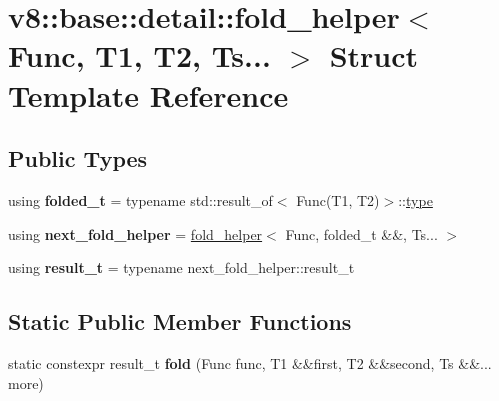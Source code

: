 \hypertarget{structv8_1_1base_1_1detail_1_1fold__helper_3_01Func_00_01T1_00_01T2_00_01Ts_8_8_8_01_4}{}\section{v8\+:\+:base\+:\+:detail\+:\+:fold\+\_\+helper$<$ Func, T1, T2, Ts... $>$ Struct Template Reference}
\label{structv8_1_1base_1_1detail_1_1fold__helper_3_01Func_00_01T1_00_01T2_00_01Ts_8_8_8_01_4}
\subsection*{Public Types}
\begin{DoxyCompactItemize}
\item 
\mbox{\label{structv8_1_1base_1_1detail_1_1fold__helper_3_01Func_00_01T1_00_01T2_00_01Ts_8_8_8_01_4_aca9659e632ee354315e602739c4b3b17}} 
using {\bfseries folded\+\_\+t} = typename std\+::result\+\_\+of$<$ Func(T1, T2)$>$\+::\mbox{\hyperlink{classstd_1_1conditional_1_1type}{type}}
\item 
\mbox{\label{structv8_1_1base_1_1detail_1_1fold__helper_3_01Func_00_01T1_00_01T2_00_01Ts_8_8_8_01_4_a92c0450cb166ab3a1f85ac339ebaeb11}} 
using {\bfseries next\+\_\+fold\+\_\+helper} = \mbox{\hyperlink{structv8_1_1base_1_1detail_1_1fold__helper}{fold\+\_\+helper}}$<$ Func, folded\+\_\+t \&\&, Ts... $>$
\item 
\mbox{\label{structv8_1_1base_1_1detail_1_1fold__helper_3_01Func_00_01T1_00_01T2_00_01Ts_8_8_8_01_4_afd7a81275cd337357f9f3e7124473fe3}} 
using {\bfseries result\+\_\+t} = typename next\+\_\+fold\+\_\+helper\+::result\+\_\+t
\end{DoxyCompactItemize}
\subsection*{Static Public Member Functions}
\begin{DoxyCompactItemize}
\item 
\mbox{\label{structv8_1_1base_1_1detail_1_1fold__helper_3_01Func_00_01T1_00_01T2_00_01Ts_8_8_8_01_4_a6c8bbf63c2297c491dc1aa3a3b510643}} 
static constexpr result\+\_\+t {\bfseries fold} (Func func, T1 \&\&first, T2 \&\&second, Ts \&\&... more)
\end{DoxyCompactItemize}


